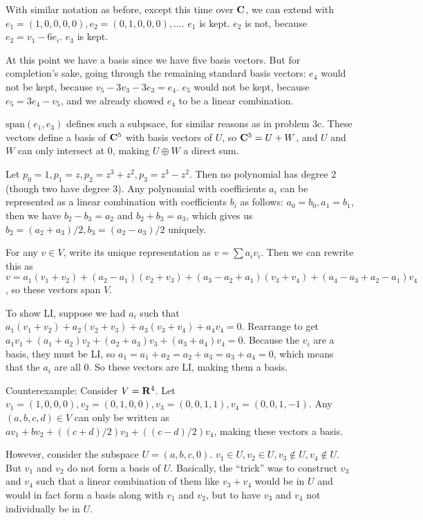 \documentclass{article}
\begin{document}
With similar notation as before, except this time over $\mathbf{C}$, we can extend
with $e_1 = (1,0,0,0,0), e_2 = (0,1,0,0,0), \ldots$. $e_1$ is kept. $e_2$ is
not, because $e_2 = v_1 - 6e_i$. $e_3$ is kept.

At this point we have a basis since we have five basis vectors. But for
completion's sake, going through the remaining standard basis vectors: $e_4$
would not be kept, because $v_5 - 3v_3 - 3e_3 = e_4$. $e_5$ would not be kept,
because $e_5 = 3e_4 - v_5$, and we already showed $e_4$ to be a linear
combination.


$\text{span}(e_1, e_3)$ defines such a subpsace, for similar reasons as in
problem 3c. These vectors define a basis of $\mathbf{C}^5$ with basis vectors of
$U$, so $\mathbf{C}^5 = U + W$, and $U$ and $W$ can only intersect at 0, making $U
\oplus W$ a direct sum.


Let $p_0 = 1, p_1 = z, p_2 = z^3 + z^2, p_3 = z^3 - z^2$. Then no polynomial has
degree 2 (though two have degree 3). Any polynomial with coefficients $a_i$ can
be represented as a linear combination with coefficients $b_i$ as follows: $a_0
= b_0, a_1 = b_1$, then we have $b_2 - b_3 = a_2$ and $b_2 + b_3 = a_3$, which
gives us $b_2 = (a_2 + a_3)/2, b_3 = (a_2 - a_3)/2$ uniquely.


For any $v \in V$, write its unique representation as $v = \sum a_iv_i$. Then we
can rewrite this as $v = a_1(v_1 + v_2) + (a_2 - a_1)(v_2 + v_3) + (a_3 - a_2 +
a_1)(v_3 + v_4) + (a_4 - a_3 + a_2 - a_1)v_4$, so these vectors span $V$.

To show LI, suppose we had $a_i$ such that $a_1(v_1 + v_2) + a_2(v_2 + v_3) +
a_3(v_3 + v_4) + a_4v_4 = 0$. Rearrange to get $a_1v_1 + (a_1 + a_2)v_2 + (a_2 +
a_3)v_3 + (a_3 + a_4)v_4 = 0$. Because the $v_i$ are a basis, they must be LI,
so $a_1 = a_1 + a_2 = a_2 + a_3 = a_3 + a_4 = 0$, which means that the $a_i$ are
all 0. So these vectors are LI, making them a basis.


Counterexample: Consider $V = \mathbf{R}^4$. Let $v_1 = (1,0,0,0), v_2 = (0,1,0,0),
v_3 = (0,0,1,1), v_4 = (0,0,1,-1)$. Any $(a,b,c,d) \in V$ can only be written as
$av_1 + bv_2 + ((c+d)/2)v_3 + ((c-d)/2)v_4$, making these vectors a basis.

However, consider the subspace $U = {(a,b,c,0)}$. $v_1 \in U, v_2 \in U, v_3
\notin U, v_4 \notin U$. But $v_1$ and $v_2$ do not form a basis of $U$.
Basically, the ``trick'' was to construct $v_3$ and $v_4$ such that a linear
combination of them like $v_3 + v_4$ would be in $U$ and would in fact form a
basis along with $v_1$ and $v_2$, but to have $v_3$ and $v_4$ not individually
be in $U$.
\end{document}
